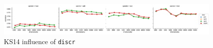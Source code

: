 \begin{figure}[b]
  \centering

  \includegraphics[width=1.1\textwidth]{supplement/figures/ks14-interaction-discr}

  \caption{KS14 influence of \texttt{discr}}
  \label{fig:ks14-discr}
\end{figure}
